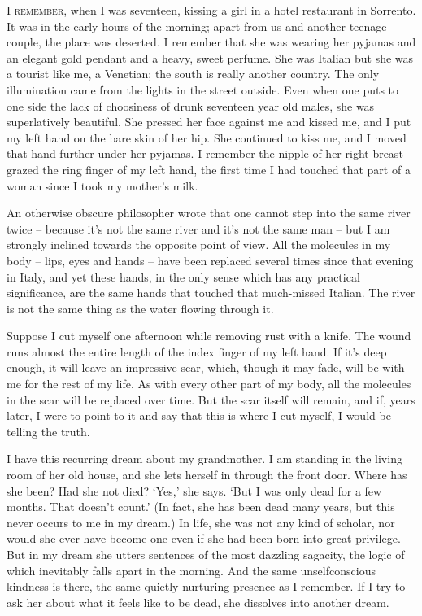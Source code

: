 \noindent \textsc{I remember}, when I was seventeen, kissing a girl in a hotel restaurant in Sorrento. It was in the early hours of the morning; apart from us and another teenage couple, the place was deserted. I remember that she was wearing her pyjamas and an elegant gold pendant and a heavy, sweet perfume. She was Italian but she was a tourist like me, a Venetian; the south is really another country. The only illumination came from the lights in the street outside. Even when one puts to one side the lack of choosiness of drunk seventeen year old males, she was superlatively beautiful. She pressed her face against me and kissed me, and I put my left hand on the bare skin of her hip. She continued to kiss me, and I moved that hand further under her pyjamas. I remember the nipple of her right breast grazed the ring finger of my left hand, the first time I had touched that part of a woman since I took my mother's milk.

An otherwise obscure philosopher wrote that one cannot step into the same river twice -- because it's not the same river and it's not the same man -- but I am strongly inclined towards the opposite point of view. All the molecules in my body -- lips, eyes and hands -- have been replaced several times since that evening in Italy, and yet these hands, in the only sense which has any practical significance, are the same hands that touched that much-missed Italian. The river is not the same thing as the water flowing through it.

\prosesep

Suppose I cut myself one afternoon while removing rust with a knife. The wound runs almost the entire length of the index finger of my left hand. If it's deep enough, it will leave an impressive scar, which, though it may fade, will be with me for the rest of my life. As with every other part of my body, all the molecules in the scar will be replaced over time. But the scar itself will remain, and if, years later, I were to point to it and say that this is where I cut myself, I would be telling the truth.

\prosesep

I have this recurring dream about my grandmother. I am standing in the living room of her old house, and she lets herself in through the front door. Where has she been? Had she not died? `Yes,' she says. `But I was only dead for a few months. That doesn't count.' (In fact, she has been dead many years, but this never occurs to me in my dream.) In life, she was not any kind of scholar, nor would she ever have become one even if she had been born into great privilege. But in my dream she utters sentences of the most dazzling sagacity, the logic of which inevitably falls apart in the morning. And the same unselfconscious kindness is there, the same quietly nurturing presence as I remember. If I try to ask her about what it feels like to be dead, she dissolves into another dream.

